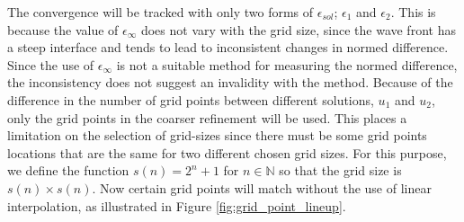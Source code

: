The convergence will be tracked with only two forms of $\epsilon_{sol}$; $\epsilon_1$ and $\epsilon_2$.
This is because the value of $\epsilon_{\infty}$ does not vary with the grid size, since the wave front has a steep interface and tends to lead to inconsistent changes in normed difference.
Since the use of $\epsilon_{\infty}$ is not a suitable method for measuring the normed difference, the inconsistency does not suggest an invalidity with the method.
Because of the difference in the number of grid points between different solutions, $u_1$ and $u_2$, only the grid points in the coarser refinement will be used.
This places a limitation on the selection of grid-sizes since there must be some grid points locations that are the same for two different chosen grid sizes.
For this purpose, we define the function $s(n) = 2^{n}+1$ for $n \in \mathbb{N}$ so that the grid size is $s(n) \times s(n)$.
Now certain grid points will match without the use of linear interpolation, as illustrated in Figure \ref{fig:grid_point_lineup}.


